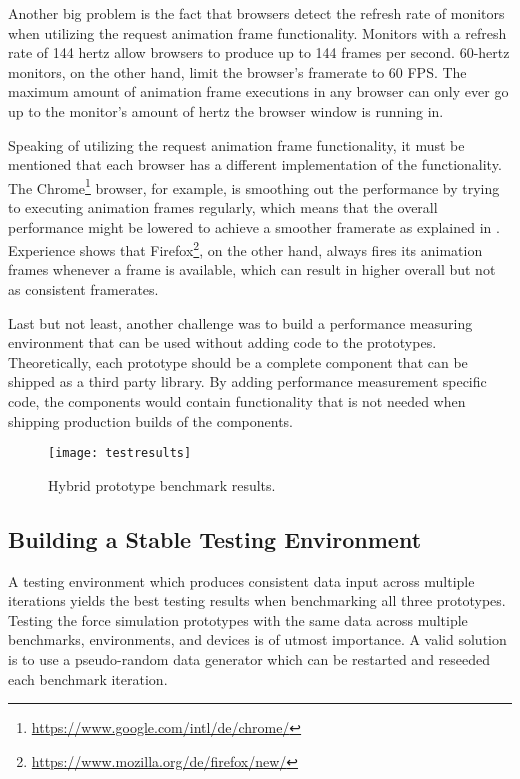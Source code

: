 Another big problem is the fact that browsers detect the refresh rate of monitors when utilizing the request animation frame functionality. Monitors with a refresh rate of 144 hertz allow browsers to produce up to 144 frames per second. 60-hertz monitors, on the other hand, limit the browser's framerate to 60 FPS. The maximum amount of animation frame executions in any browser can only ever go up to the monitor's amount of hertz the browser window is running in. 

Speaking of utilizing the request animation frame functionality, it must be mentioned that each browser has a different implementation of the functionality. The Chrome\footnote{\url{https://www.google.com/intl/de/chrome/}} browser, for example, is smoothing out the performance by trying to executing animation frames regularly, which means that the overall performance might be lowered to achieve a smoother framerate as explained in \cite{ChromeRAF}. Experience shows that Firefox\footnote{\url{https://www.mozilla.org/de/firefox/new/}}, on the other hand, always fires its animation frames whenever a frame is available, which can result in higher overall but not as consistent framerates.

Last but not least, another challenge was to build a performance measuring environment that can be used without adding code to the prototypes. Theoretically, each prototype should be a complete component that can be shipped as a third party library. By adding performance measurement specific code, the components would contain functionality that is not needed when shipping production builds of the components.

\begin{figure}
  \centering
  \texttt{[image: testresults]}
  \caption{Hybrid prototype benchmark results.}
  \label{fig:reactD3benchResult}
\end{figure}

\subsection{Building a Stable Testing Environment}
\label{sub:perfImplDetails}

A testing environment which produces consistent data input across multiple iterations yields the best testing results when benchmarking all three prototypes. Testing the force simulation prototypes with the same data across multiple benchmarks, environments, and devices is of utmost importance. A valid solution is to use a pseudo-random data generator which can be restarted and reseeded each benchmark iteration.

